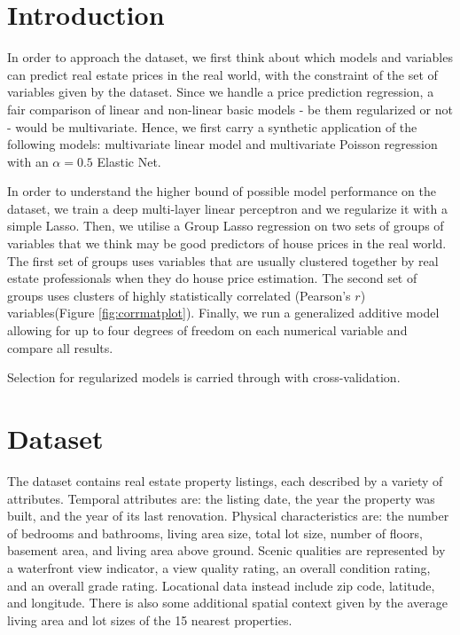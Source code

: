 \documentclass[a4paper, 11pt]{article}
\begin{document}
\begin{multicols}{2}

\section{Introduction} \vspace{-7pt}
In order to approach the dataset, we first think about which models and variables can predict real estate prices in the real world, with the constraint of the set of variables given by the dataset. Since we handle a price prediction regression, a fair comparison of linear and non-linear basic models - be them regularized or not - would be multivariate. Hence, we first carry a synthetic application of the following models: multivariate linear model and multivariate Poisson regression with an $\alpha = 0.5$ Elastic Net.

In order to understand the higher bound of possible model performance on the dataset, we train a deep multi-layer linear perceptron and we regularize it with a simple Lasso.
Then, we utilise a Group Lasso regression on two sets of groups of variables that we think may be good predictors of house prices in the real world. The first set of groups uses variables that are usually clustered together by real estate professionals when they do house price estimation. The second set of groups uses clusters of highly statistically correlated (Pearson's $r$) variables(Figure \ref{fig:corrmatplot}). Finally, we run a generalized additive model allowing for up to four degrees of freedom on each numerical variable and compare all results.

Selection for regularized models is carried through with cross-validation.

\section{Dataset} \vspace{-7pt}
The dataset contains real estate property listings, each described by a variety of attributes. Temporal attributes are: the listing date, the year the property was built, and the year of its last renovation. Physical characteristics are: the number of bedrooms and bathrooms, living area size, total lot size, number of floors, basement area, and living area above ground. Scenic qualities are represented by a waterfront view indicator, a view quality rating, an overall condition rating, and an overall grade rating. Locational data instead include zip code, latitude, and longitude. There is also some additional spatial context given by the average living area and lot sizes of the 15 nearest properties.


\end{multicols}
\end{document}
